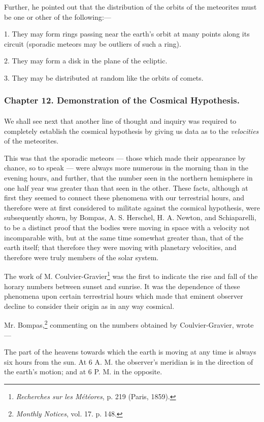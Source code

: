 \documentclass[a4paper, 12pt, oneside, polutonikogreek, english]{article}
\begin{document}
Further, he pointed out that the distribution of the orbits of the meteorites must be one or other of the following:---

1. They may form rings passing near the earth's orbit at many points along its circuit (sporadic meteors may be outliers of such a ring).

2. They may form a disk in the plane of the ecliptic.

3. They may be distributed at random like the orbits of comets.
\clearpage
\subsubsection{Chapter 12. Demonstration of the Cosmical Hypothesis.}
\paragraph{}
We shall see next that another line of thought and inquiry was required to completely establish the cosmical hypothesis by giving us data as to the \emph{velocities} of the meteorites.

This was that the sporadic meteors --- those which made their appearance by chance, so to speak --- were always more numerous in the morning than in the evening hours, and further, that the number seen in the northern hemisphere in one half year was greater than that seen in the other. These facts, although at first they seemed to connect these phenomena with our terrestrial hours, and therefore were at first considered to militate against the cosmical hypothesis, were subsequently shown, by Bompas, A. S. Herschel, H. A. Newton, and Schiaparelli, to be a distinct proof that the bodies were moving in space with a velocity not incomparable with, but at the same time somewhat greater than, that of the earth itself; that therefore they were moving with planetary velocities, and therefore were truly members of the solar system.

The work of M. Coulvier-Gravier\footnote{\emph{Recherches sur les Météores}, p. 219 (Paris, 1859).} was the first to indicate the rise and fall of the horary numbers between sunset and sunrise. It was the dependence of these phenomena upon certain terrestrial hours which made that eminent observer decline to consider their origin as in any way cosmical.

Mr. Bompas,\footnote{\emph{Monthly Notices}, vol. 17. p. 148.} commenting on the numbers obtained by Coulvier-Gravier, wrote ---

The part of the heavens towards which the earth is moving at any time is always six hours from the sun. At 6 A. M. the observer's meridian is in the direction of the earth's motion; and at 6 P. M. in the opposite.
\end{document}
